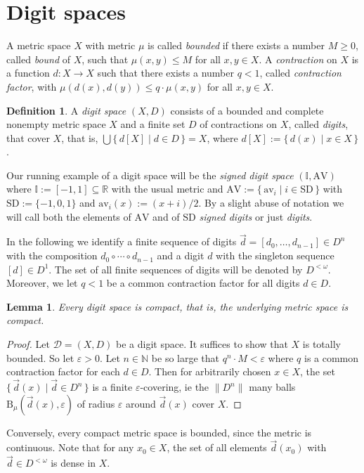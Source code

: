 \documentclass[microtype]{jloganal}
\theoremstyle{plain}
\newtheorem{lemma}[theorem]{Lemma}
\theoremstyle{definition}
\newtheorem{definition}[theorem]{Definition}
\newcommand{\II}{\mathbb{I}}
\newcommand{\NN}{\mathbb{N}}
\newcommand{\RR}{\mathbb{R}}
\newcommand{\AV}{\mathrm{AV}}
\newcommand{\av}[1]{\mathrm{av}_{#1}}
\newcommand{\ball}[3]{\mathrm{B}_{#1}(#2,#3)}
\newcommand{\mds}[1]{\mathcal{#1}}
\newcommand{\SD}{\mathrm{SD}}
\newcommand{\set}[2]{\mbox{$\{\,#1 \mid #2 \,\}$}}
\newcommand{\card}[1]{\mathopen\parallel #1 \mathclose\parallel}
\begin{document}
\section{Digit spaces}
\label{sec-digit-space}
A metric space $X$ with metric $\mu$ is called \emph{bounded} if there exists
a number $M\ge 0$, called \emph{bound} of $X$, such that
$\mu(x,y)\le M$ for all $x,y\in X$.  
A \emph{contraction} on $X$ is a function $d:X\to X$ such that there exists 
a number $q<1$, called \emph{contraction factor}, with  
$\mu(d(x),d(y))\le q\cdot\mu(x,y)$ for all $x,y\in X$. 
\begin{definition}
\label{def-digit-space}
A \emph{digit space} $(X,D)$ consists of
a bounded and complete nonempty metric space $X$ and a 
finite set $D$ of contractions on $X$, called \emph{digits}, 
that cover $X$, that is, $\bigcup\{\,d[X] \mid d\in D\,\} = X$, where $d[X] := \set{d(x)}{x \in X}$. 
\end{definition}
Our running example of a digit space will be the \emph{signed digit space}
$(\II,\AV)$ where $\II := [-1,1] \subseteq \RR$ with the 
usual metric and $\AV := \{\,\av{i} \mid i\in\SD\,\}$ with 
$\SD := \{-1,0,1\}$ and $\av{i}(x) := (x+i)/2$.
By a slight abuse of notation we will call both the elements of $\AV$ and of 
$\SD$ \emph{signed digits} or just \emph{digits}.

In the following we identify a finite sequence of digits 
$\vec d = [d_0,\ldots,d_{n-1}]\in D^n$ with the composition
$d_0\circ\cdots\circ d_{n-1}$ and a digit $d$ with the singleton sequence $[d] \in D^1$. The set of all finite sequences of digits will be denoted by $D^{< \omega}$.
Moreover, we let $q < 1$ be a common contraction factor for all digits $d \in D$.

\begin{lemma}
\label{lem-digit-compact}
Every digit space is compact, that is, the underlying metric space is
compact.
\end{lemma}
\begin{proof}
Let $\mds{D} = (X,D)$ be a digit space. 
It suffices to show that $X$ is totally bounded. So let $\varepsilon>0$.
Let $n\in\NN$ be so large that $q^n\cdot M < \varepsilon$ where $q$ is a common
contraction factor for each $d\in D$. Then for 
arbitrarily chosen $x\in X$, the set $\{\,\vec d(x) \mid \vec d\in D^n\,\}$ 
is a finite $\varepsilon$-covering, ie the $\card{D^n}$ many balls $\ball{\mu}{\vec d (x)}{\varepsilon}$ of radius $\varepsilon$ around $\vec{d}(x)$ cover $X$. 
\end{proof}
Conversely, every compact metric space is bounded, since the metric is continuous. Note that for any $x_0 \in X$, the set of all elements $\vec{d}(x_0)$ with $\vec{d} \in D^{< \omega}$ is dense in $X$.
\end{document}
